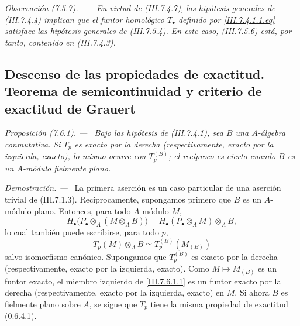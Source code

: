 \documentclass[10pt,oneside]{book}
\newcommand{\sref}[2][]{\textup{(#2)}}
\newenvironment{proposition}[1][]{\par\medskip\noindent\itshape Proposición (#1). ---\ }{\par}
\newenvironment{remark}[1][]{\par\medskip\noindent\itshape Observación (#1). ---\ }{\par}
\newenvironment{proof}{\par\medskip\noindent\textit{Demostración. ---\ }}{\par}
\begin{document}
\begin{remark}[7.5.7]
\label{III.7.5.7}
En virtud de \sref{III.7.4.7}, las hipótesis generales de
\sref{III.7.4.4} implican que el funtor homológico $T_\bullet$
definido por \eqref{III.7.4.1.1.eq} satisface las hipótesis generales
de \sref{III.7.5.4}. En este caso, \sref{III.7.5.6} está, por tanto,
contenido en \sref{III.7.4.3}.
\end{remark}

\subsection{Descenso de las propiedades de exactitud. Teorema de
semicontinuidad y criterio de exactitud de Grauert}
\label{subsection:III.7.6}
\label{III.7.6}

\begin{proposition}[7.6.1]
\label{III.7.6.1}
Bajo las hipótesis de \sref{III.7.4.1}, sea $B$ una $A$-álgebra
conmutativa. Si $T_p$ es exacto por la derecha (respectivamente,
exacto por la izquierda, exacto), lo mismo ocurre con $T_p^{(B)}$;
el recíproco es cierto cuando $B$ es un $A$-módulo fielmente plano.
\end{proposition}

\begin{proof}
La primera aserción es un caso particular de una aserción trivial de
\sref{III.7.1.3}. Recíprocamente, supongamos primero que $B$ es un
$A$-módulo plano. Entonces, para todo $A$-módulo $M$,
\[
  H_\bullet\bigl(P_\bullet\otimes_A(M\otimes_A B)\bigr)
  =
  H_\bullet(P_\bullet\otimes_A M)\otimes_A B,
\]
lo cual también puede escribirse, para todo $p$,
\[
  T_p(M)\otimes_A B
  \simeq
  T_p^{(B)}(M_{(B)})
  \tag{7.6.1.1}\label{III.7.6.1.1}
\]
salvo isomorfismo canónico. Supongamos que $T_p^{(B)}$ es exacto por
la derecha (respectivamente, exacto por la izquierda, exacto). Como
$M\mapsto M_{(B)}$ es un funtor exacto, el miembro izquierdo de
\eqref{III.7.6.1.1} es un funtor exacto por la derecha
(respectivamente, exacto por la izquierda, exacto) en $M$. Si ahora
$B$ es fielmente plano sobre $A$, se sigue que $T_p$ tiene la misma
propiedad de exactitud \sref[0]{0.6.4.1}.
\end{proof}
\end{document}
